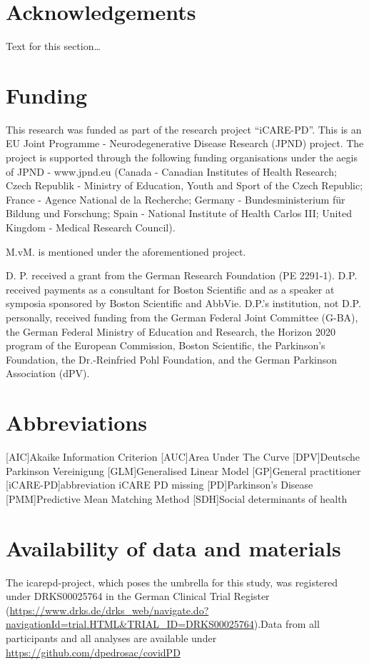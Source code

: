 \documentclass{bmcart}
\begin{document}
\begin{backmatter}

\section*{Acknowledgements}%
Text for this section\ldots

\section*{Funding}%
This research was funded as part of the research project ``iCARE-PD''. This is an EU Joint Programme - Neurodegenerative Disease Research (JPND) project. The project is supported through the following funding organisations under the aegis of JPND - www.jpnd.eu (Canada - Canadian Institutes of Health Research; Czech Republik - Ministry of Education, Youth and Sport of the Czech Republic; France - Agence National de la Recherche; Germany - Bundesministerium für Bildung und Forschung; Spain - National Institute of Health Carlos III; United Kingdom - Medical Research Council). 

M.vM. is mentioned under the aforementioned project. 

D. P. received a grant from the German Research Foundation (PE 2291-1). D.P. received payments as a consultant for Boston Scientific and as a speaker at symposia sponsored by Boston Scientific and AbbVie. D.P.'s institution, not D.P. personally, received funding from the German Federal Joint Committee (G-BA), the German Federal Ministry of Education and Research, the Horizon 2020 program of the European Commission, Boston Scientific, the Parkinson’s Foundation, the Dr.-Reinfried Pohl Foundation, and the German Parkinson Association (dPV).

\section*{Abbreviations}
\begin{acronym}[ECU]
[AIC]{Akaike Information Criterion}
[AUC]{Area Under The Curve}
[DPV]{Deutsche Parkinson Vereinigung}
[GLM]{Generalised Linear Model}
[GP]{General practitioner}
[iCARE-PD]{abbreviation iCARE PD missing}
[PD]{Parkinson's Disease}
[PMM]{Predictive Mean Matching Method}
[SDH]{Social determinants of health}
\end{acronym}


\section*{Availability of data and materials}
The \acs{icarepd}-project, which poses the umbrella for this study, was registered under DRKS00025764 in the German Clinical Trial Register (\url{https://www.drks.de/drks_web/navigate.do?navigationId=trial.HTML&TRIAL_ID=DRKS00025764}).Data from all participants and all analyses are available under \url{https://github.com/dpedrosac/covidPD}


\end{backmatter}
\end{document}
